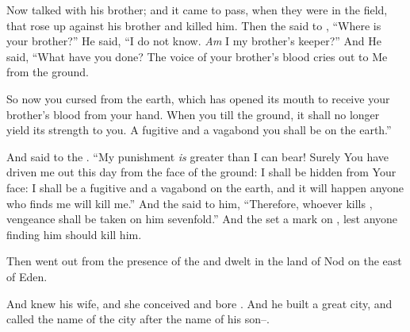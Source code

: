 \bverse Now  talked with  his brother; and it came to pass, when they were in the field, that  rose up against  his brother and killed him.
\bverse Then the \lord said to , ``Where is  your brother?'' He said, ``I do not know. \textit{Am} I my brother's keeper?''
\bverse And He said, ``What have you done? The voice of your brother's blood cries out to Me from the ground.

\bverse So now you \are cursed from the earth, which has opened its mouth to receive your brother's blood from your hand.
\bverse When you till the ground, it shall no longer yield its strength to you. A fugitive and a vagabond you shall be on the earth.''
	
\bverse And  said to the \lord. ``My punishment \textit{is} greater than I can bear!
\bverse Surely You have driven me out this day from the face of the ground: I shall be hidden from Your face: I shall be a fugitive and a vagabond on the earth, and it will happen \that anyone who finds me will kill me.''
\bverse And the \lord said to him, ``Therefore, whoever kills , vengeance shall be taken on him sevenfold.'' And the \lord set a mark on , lest anyone finding him should kill him.


\bverse Then  went out from the presence of the \lord and dwelt in the land of Nod on the east of Eden.

\bverse And  knew his wife, and she conceived and bore . And he built a great city, and called the name of the city after the name of his son--.
	
